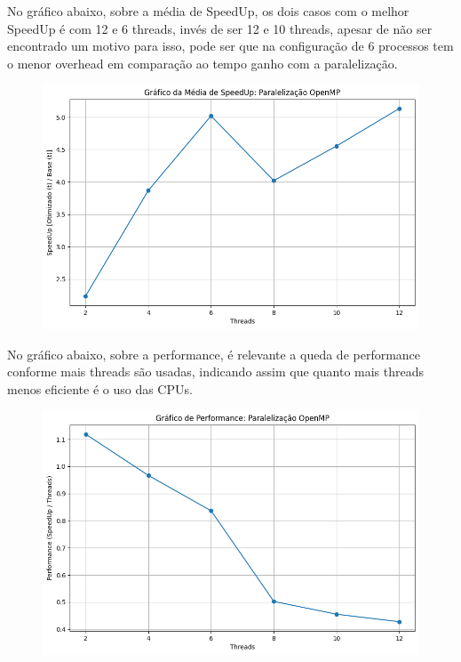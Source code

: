 No gráfico abaixo, sobre a média de SpeedUp, os dois casos com o melhor SpeedUp é com 12 e 6 threads, invés de ser 12 e 10 threads, apesar de não ser encontrado um motivo para isso, pode ser que na configuração de 6 processos tem o menor overhead em comparação ao tempo ganho com a paralelização.

\begin{figure}[H]
    \centering
    \includegraphics[width=1\linewidth]{../assets/OMP - SpeedUp.png}
\end{figure}

No gráfico abaixo, sobre a performance, é relevante a queda de performance conforme mais threads são usadas, indicando assim que quanto mais threads menos eficiente é o uso das CPUs.

\begin{figure}[H]
    \centering
    \includegraphics[width=1\linewidth]{../assets/OMP - Performance.png}
\end{figure}

